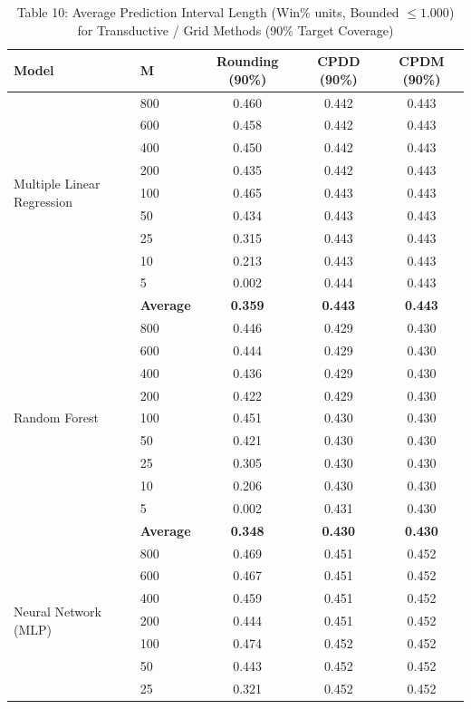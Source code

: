 \documentclass[11pt,a4paper]{article}
\begin{document}
\begin{table}[H]
\centering
\caption{Table 10: Average Prediction Interval Length (Win\% units, Bounded $\le 1.000$) for Transductive / Grid Methods (90\% Target Coverage)}
\label{tab:team_tab10}
\scriptsize
\begin{tabular}{llccc}
\toprule
Model & M & Rounding (90\%) & CPDD (90\%) & CPDM (90\%) \\
\midrule
\multirow{9}{*}{Multiple Linear Regression}
 & 800 & 0.460 & 0.442 & 0.443 \\
 & 600 & 0.458 & 0.442 & 0.443 \\
 & 400 & 0.450 & 0.442 & 0.443 \\
 & 200 & 0.435 & 0.442 & 0.443 \\
 & 100 & 0.465 & 0.443 & 0.443 \\
 & 50  & 0.434 & 0.443 & 0.443 \\
 & 25  & 0.315 & 0.443 & 0.443 \\
 & 10  & 0.213 & 0.443 & 0.443 \\
 & 5   & 0.002 & 0.444 & 0.443 \\
 & \textbf{Average} & \textbf{0.359} & \textbf{0.443} & \textbf{0.443} \\
\midrule
\multirow{9}{*}{Random Forest}
 & 800 & 0.446 & 0.429 & 0.430 \\
 & 600 & 0.444 & 0.429 & 0.430 \\
 & 400 & 0.436 & 0.429 & 0.430 \\
 & 200 & 0.422 & 0.429 & 0.430 \\
 & 100 & 0.451 & 0.430 & 0.430 \\
 & 50  & 0.421 & 0.430 & 0.430 \\
 & 25  & 0.305 & 0.430 & 0.430 \\
 & 10  & 0.206 & 0.430 & 0.430 \\
 & 5   & 0.002 & 0.431 & 0.430 \\
 & \textbf{Average} & \textbf{0.348} & \textbf{0.430} & \textbf{0.430} \\
\midrule
\multirow{9}{*}{Neural Network (MLP)}
 & 800 & 0.469 & 0.451 & 0.452 \\
 & 600 & 0.467 & 0.451 & 0.452 \\
 & 400 & 0.459 & 0.451 & 0.452 \\
 & 200 & 0.444 & 0.451 & 0.452 \\
 & 100 & 0.474 & 0.452 & 0.452 \\
 & 50  & 0.443 & 0.452 & 0.452 \\
 & 25  & 0.321 & 0.452 & 0.452 \\

\end{tabular}
\end{table}
\end{document}

